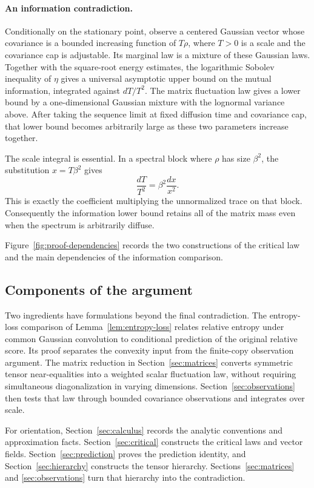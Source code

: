 \paragraph{An information contradiction.}
Conditionally on the stationary point, observe a centered Gaussian
vector whose covariance is a bounded increasing function of
\(T\rho\), where \(T>0\) is a scale and the covariance cap is
adjustable.  Its marginal law is a mixture of these Gaussian laws.
Together with the square-root energy estimates, the logarithmic Sobolev
inequality of \(\eta\) gives a universal asymptotic upper bound on the
mutual information, integrated against \(dT/T^2\).
The matrix fluctuation law gives a lower bound by a one-dimensional
Gaussian mixture with the lognormal variance above.
After taking the sequence limit at fixed diffusion time and covariance
cap, that lower bound becomes arbitrarily large as these two
parameters increase together.

The scale integral is essential.  In a spectral block where
\(\rho\) has size \(\beta^2\), the substitution \(x=T\beta^2\) gives
\[
 \frac{dT}{T^2}=\beta^2\frac{dx}{x^2}.
\]
This is exactly the coefficient multiplying the unnormalized trace on
that block.
Consequently the information lower bound retains all of the matrix
mass even when the spectrum is arbitrarily diffuse.

Figure~\ref{fig:proof-dependencies} records the two constructions of the
critical law and the main dependencies of the information comparison.


\subsection{Components of the argument}

Two ingredients have formulations beyond the final contradiction.
The entropy-loss comparison of Lemma~\ref{lem:entropy-loss} relates
relative entropy under common Gaussian convolution to conditional
prediction of the original relative score.  Its proof separates
the convexity input from the finite-copy observation argument.
The matrix reduction in Section~\ref{sec:matrices} converts symmetric
tensor near-equalities into a weighted scalar fluctuation law,
without requiring simultaneous diagonalization in varying
dimensions.  Section~\ref{sec:observations} then tests that law through
bounded covariance observations and integrates over scale.

For orientation, Section~\ref{sec:calculus} records the analytic
conventions and approximation facts.
Section~\ref{sec:critical} constructs the critical laws and vector
fields.
Section~\ref{sec:prediction} proves the prediction identity,
and Section~\ref{sec:hierarchy} constructs the tensor hierarchy.
Sections~\ref{sec:matrices} and \ref{sec:observations} turn that
hierarchy into the contradiction.

